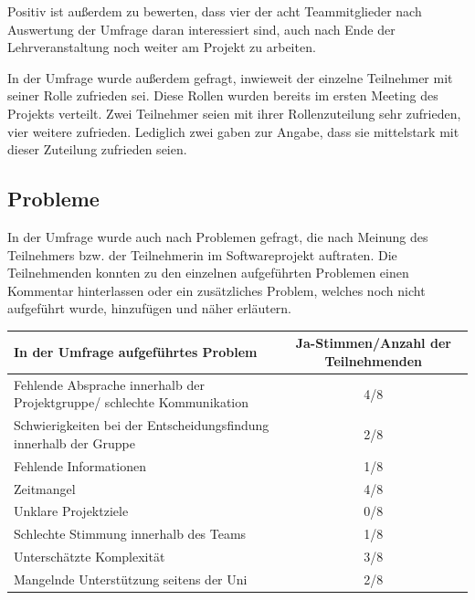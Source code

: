 \documentclass[../review_3.tex]{subfiles}
\begin{document}
Positiv ist außerdem zu bewerten, dass vier der acht Teammitglieder nach Auswertung der Umfrage daran interessiert sind, auch nach Ende der Lehrveranstaltung noch weiter am Projekt zu arbeiten.

In der Umfrage wurde außerdem gefragt, inwieweit der einzelne Teilnehmer mit seiner Rolle zufrieden sei. Diese Rollen wurden bereits im ersten Meeting des Projekts verteilt.
Zwei Teilnehmer seien mit ihrer Rollenzuteilung sehr zufrieden, vier weitere zufrieden. Lediglich zwei gaben zur Angabe, dass sie mittelstark mit dieser Zuteilung zufrieden seien.

\subsection{Probleme}
In der Umfrage wurde auch nach Problemen gefragt, die nach Meinung des Teilnehmers bzw. der Teilnehmerin im Softwareprojekt auftraten. Die Teilnehmenden konnten zu den einzelnen aufgeführten Problemen einen Kommentar hinterlassen oder ein zusätzliches Problem, welches noch nicht aufgeführt wurde, hinzufügen und näher erläutern.

\begin{longtable}[h]{p{} c}
    \toprule
    \textbf{In der Umfrage aufgeführtes Problem}                            & \textbf{Ja-Stimmen/Anzahl der Teilnehmenden} \\ \midrule \endhead
    Fehlende Absprache innerhalb der Projektgruppe/ schlechte Kommunikation & 4/8                                          \\
    Schwierigkeiten bei der Entscheidungsfindung innerhalb der Gruppe       & 2/8                                          \\
    Fehlende Informationen                                                  & 1/8                                          \\
    Zeitmangel                                                              & 4/8                                          \\
    Unklare Projektziele                                                    & 0/8                                          \\
    Schlechte Stimmung innerhalb des Teams                                  & 1/8                                          \\
    Unterschätzte Komplexität                                               & 3/8                                          \\
    Mangelnde Unterstützung seitens der Uni                                 & 2/8                                          \\ \bottomrule
\end{longtable}
\end{document}
